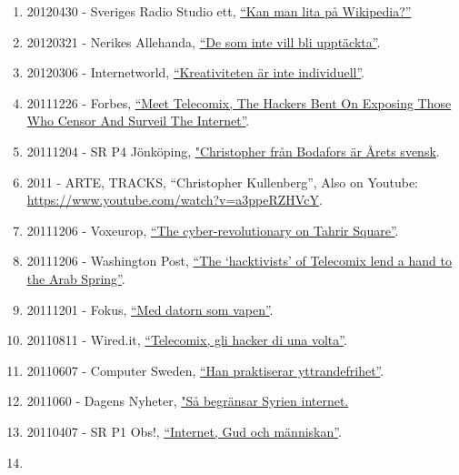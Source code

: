 \documentclass[
]{article}
\begin{document}
\begin{enumerate}
\item
  20120430 - Sveriges Radio Studio ett,
  \href{http://t.sr.se/1cRSOfk}{``Kan man lita på Wikipedia?''}
\item
  20120321 - Nerikes Allehanda,
  \href{http://na.se/nyheter/orebro/1.1589481--de-som-inte-vill-blir-inte-upptackta-}{``De
  som inte vill bli upptäckta''}.
\item
  20120306 - Internetworld,
  \href{http://www.idg.se/2.1085/1.435933/kreativiteten-ar-inte-individuell}{``Kreativiteten
  är inte individuell''}.
\item
  20111226 - Forbes,
  \href{http://www.forbes.com/sites/andygreenberg/2011/12/26/meet-telecomix-the-hackers-bent-on-exposing-those-who-censor-and-surveil-the-internet/}{``Meet
  Telecomix, The Hackers Bent On Exposing Those Who Censor And Surveil
  The Internet''}.
\item
  20111204 - SR P4 Jönköping, \href{http://t.sr.se/1gy095E}{"Christopher
  från Bodafors är Årets svensk}.
\item
  2011 - ARTE, TRACKS, ``Christopher Kullenberg'', Also on Youtube:
  \url{https://www.youtube.com/watch?v=a3ppeRZHVcY}.
\item
  20111206 - Voxeurop,
  \href{http://www.voxeurop.eu/en/content/article/1254651-cyber-revolutionary-tahrir-square}{``The
  cyber-revolutionary on Tahrir Square''}.
\item
  20111206 - Washington Post,
  \href{https://www.washingtonpost.com/lifestyle/style/the-hacktivists-of-telecomix-lend-a-hand-to-the-arab-spring/2011/12/05/gIQAAosraO_story.html}{``The
  `hacktivists' of Telecomix lend a hand to the Arab Spring''}.
\item
  20111201 - Fokus,
  \href{http://www.fokus.se/2011/12/med-datorn-som-vapen/}{``Med datorn
  som vapen''}.
\item
  20110811 - Wired.it,
  \href{http://daily.wired.it/news/internet/2011/08/11/telecomix-hacker-egitto-tunisia-iran-13861.html}{``Telecomix,
  gli hacker di una volta''}.
\item
  20110607 - Computer Sweden,
  \href{http://computersweden.idg.se/2.2683/1.388901/han-praktiserar-yttrandefrihet}{``Han
  praktiserar yttrandefrihet''}.
\item
  2011060 - Dagens Nyheter,
  \href{http://www.dn.se/nyheter/varlden/sa-begransar-syrien-friheten-pa-internet}{"Så
  begränsar Syrien internet.}
\item
  20110407 - SR P1 Obs!, \href{http://t.sr.se/1zjt3PQ}{``Internet, Gud
  och människan''}.
\item

\end{enumerate}
\end{document}

